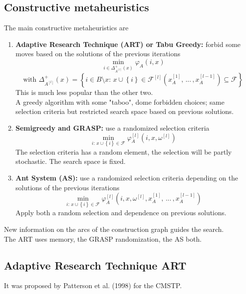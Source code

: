 \subsection{Constructive metaheuristics}
The main constructive metaheuristics are
\begin{enumerate}
	\item \textbf{Adaptive Research Technique (ART) or Tabu Greedy:} forbid some moves based on the solutions of the previous iterations
	$$ \min_{i \in \Delta_{A^{[l]}}^+ (x) } \varphi_A (i, x) $$
	$$ \text{with } \Delta_{A^{[l]}}^+ (x) = \left\{ i \in B \setminus x: \, x \cup \left\{i\right\} \in \mathcal{F}^{[l]} \left(x_A^{[1]}, \, ... \, , x_A^{[l-1]}\right) \subseteq \mathcal{F} \right\}$$
	This is much less popular than the other two.\\
	A greedy algorithm with some "taboo", dome forbidden choices; same selection criteria but restricted search space based on previous solutions.\\
	
	\item \textbf{Semigreedy and GRASP:} use a randomized selection criteria
	$$ \min_{i: \, x \cup \left\{i\right\} \in \mathcal{F}} \varphi_A^{[l]} \left(i, x, \omega^{[l]}\right) $$
	The selection criteria has a random element, the selection will be partly stochastic. The search space is fixed.\\
	
	\item \textbf{Ant System (AS):} use a randomized selection criteria depending on the solutions of the previous iterations
	$$ \min_{i: \, x \cup \left\{i\right\} \in \mathcal{F}} \varphi_A^{[l]} \left(i, x, \omega^{[l]}, x_A^{[1]}, \, ... \, , x_A^{[l-1]}\right) $$
	Apply both a random selection and dependence on previous solutions.\\
\end{enumerate}

New information on the arcs of the construction graph guides the search.\\
The ART uses memory, the GRASP randomization, the AS both.\\

\newpage

\subsection{Adaptive Research Technique ART}
It was proposed by Patterson et al. (1998) for the CMSTP.\\

